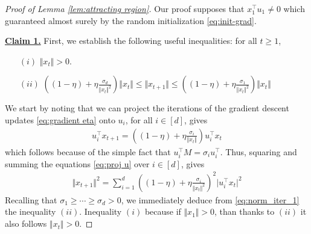 \begin{proof}[Proof of Lemma \ref{lem:attracting region}] Our proof supposes that $x_1^\top u_1 \neq 0$ which guaranteed almost surely by the random initialization \eqref{eq:init-grad}.
  

\medskip

\underline{\textbf{Claim 1.}} First, we establish the following useful inequalities: for all $t \ge 1$,
\begin{itemize}
    \item [$(i)$] $\Vert x_t \Vert > 0$.
    \item [$(ii)$] $\left((1-\eta) + \eta \frac{\sigma_d}{\Vert x_t \Vert^2}\right) \Vert x_t \Vert  \le \Vert x_{t+1} \Vert \le  \left( (1-\eta) + \eta \frac{\sigma_1}{\Vert x_t \Vert^2}\right) \Vert x_t \Vert$
\end{itemize}
We start by noting that we can project the iterations of the gradient descent updates \eqref{eq:gradient eta} onto $u_i$, for all $i \in [d]$, gives 
\begin{align}\label{eq:proj u}
         u_i^\top x_{t+1} = \left((1-\eta) + \eta \frac{\sigma_i}{\Vert x_t \Vert}\right) u_i^\top x_{t} 
\end{align}
which follows because of the simple fact that $u_i^\top M = \sigma_i u_i^\top$. Thus, squaring and summing the equations \eqref{eq:proj u} over $i \in [d]$, gives 
\begin{align}\label{eq:norm_iter_1}
    \Vert x_{t+1} \Vert^2 = \sum_{i=1}^d \left((1-\eta) + \eta \frac{\sigma_i}{\Vert x_t \Vert^2}\right)^2 \vert u_i^\top x_t \vert^2 
\end{align}
Recalling that $\sigma_1 \ge \cdots \ge \sigma_d > 0$, we immediately deduce from \eqref{eq:norm_iter_1} the inequality $(ii)$. Inequality $(i)$ because if $\Vert x_1 \Vert > 0$, than thanks to $(ii)$ it also follows $\Vert x_t \Vert > 0$.

\medskip 


\end{proof}
